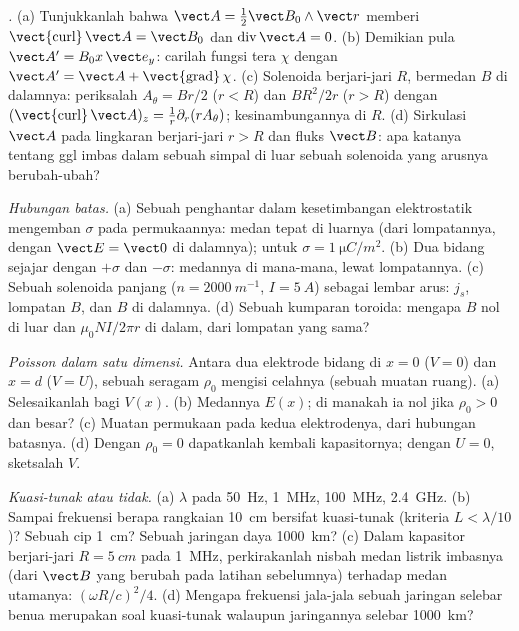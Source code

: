 \begin{exercise}[$\star\star$]\label{exo:b2:maxwell-equations:5}
\emph{.} (a) Tunjukkanlah bahwa $\vect A = \tfrac12\vect B_0\wedge\vect r$
memberi $\operatorname{\vect{curl}}\vect A = \vect B_0$ dan $\operatorname{div}\vect A = 0$.
(b) Demikian pula $\vect A' = B_0x\,\vect e_y$: carilah fungsi tera $\chi$ dengan
$\vect A' = \vect A + \operatorname{\vect{grad}}\chi$. (c) Solenoida berjari-jari $R$,
bermedan $B$ di dalamnya: periksalah $A_\theta = Br/2$ ($r < R$) dan $BR^2/2r$ ($r > R$)
dengan $(\operatorname{\vect{curl}}\vect A)_z = \frac1r\partial_r(rA_\theta)$; kesinambungannya di $R$.
(d) Sirkulasi $\vect A$ pada lingkaran berjari-jari $r > R$ dan fluks
$\vect B$: apa katanya tentang ggl imbas dalam sebuah simpal di luar sebuah
solenoida yang arusnya berubah-ubah?
\end{exercise}

\begin{exercise}[$\star\star$]\label{exo:b2:maxwell-equations:6}
\emph{Hubungan batas.} (a) Sebuah penghantar dalam kesetimbangan
elektrostatik mengemban $\sigma$ pada permukaannya: medan tepat di luarnya (dari
lompatannya, dengan $\vect E = \vect 0$ di dalamnya); untuk $\sigma = \qty{1}{\micro C/m^2}$. (b) Dua
bidang sejajar dengan $+\sigma$ dan $-\sigma$: medannya di mana-mana, lewat lompatannya.
(c) Sebuah solenoida panjang ($n = \qty{2000}{m^{-1}}$, $I = \qty{5}{A}$) sebagai lembar
arus: $j_s$, lompatan $B$, dan $B$ di dalamnya. (d) Sebuah kumparan toroida: mengapa $B$
nol di luar dan $\mu_0NI/2\pi r$ di dalam, dari lompatan yang sama?
\end{exercise}

\begin{exercise}[$\star\star$]\label{exo:b2:maxwell-equations:7}
\emph{Poisson dalam satu dimensi.} Antara dua elektrode bidang di $x = 0$
($V = 0$) dan $x = d$ ($V = U$), sebuah  seragam $\rho_0$ mengisi
celahnya (sebuah muatan ruang). (a) Selesaikanlah  bagi $V(x)$. (b) Medannya
$E(x)$; di manakah ia nol jika $\rho_0 > 0$ dan besar? (c) Muatan permukaan pada
kedua elektrodenya, dari hubungan batasnya. (d) Dengan $\rho_0 = 0$
dapatkanlah kembali kapasitornya; dengan $U = 0$, sketsalah $V$.
\end{exercise}

\begin{exercise}[$\star\star$]\label{exo:b2:maxwell-equations:8}
\emph{Kuasi-tunak atau tidak.} (a) $\lambda$ pada \qty{50}{Hz}, \qty{1}{MHz},
\qty{100}{MHz}, \qty{2.4}{GHz}. (b) Sampai frekuensi berapa rangkaian \qty{10}{cm}
bersifat kuasi-tunak (kriteria $L < \lambda/10$)? Sebuah cip \qty{1}{cm}? Sebuah
jaringan daya \qty{1000}{km}? (c) Dalam kapasitor berjari-jari $R = \qty{5}{cm}$ pada
\qty{1}{MHz}, perkirakanlah nisbah medan listrik imbasnya (dari
$\vect B$ yang berubah pada latihan sebelumnya) terhadap medan utamanya: $(\omega R/c)^2
/4$. (d) Mengapa frekuensi jala-jala sebuah jaringan selebar benua merupakan soal
kuasi-tunak walaupun jaringannya selebar \qty{1000}{km}?
\end{exercise}

